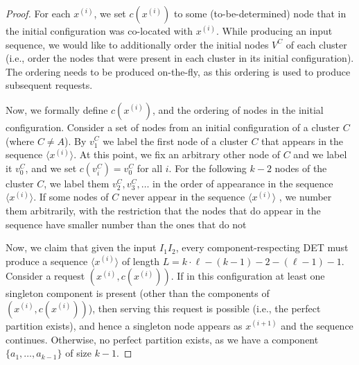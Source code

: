 \begin{proof}
  For each $x^{(i)}$, we set $c(x^{(i)})$ to some (to-be-determined) node that in the initial configuration was co-located with $x^{(i)}$.
  While producing an input sequence, we would like to additionally order the initial nodes $V^C$ of each cluster (i.e., order the nodes that were present in each cluster in its initial configuration).
  The ordering needs to be produced on-the-fly, as this ordering is used to produce subsequent requests.
  
  
  Now, we formally define $c(x^{(i)})$, and the ordering of nodes in the initial configuration.
  Consider a set of nodes from an initial configuration of a cluster $C$ (where $C \neq A$).
  By $v^C_1$ we label the first node of a cluster $C$ that appears in the sequence $\langle x^{(i)}\rangle$.
  At this point, we fix an arbitrary other node of $C$ and we label it $v^C_0$, and we set $c(v^C_i) = v^C_0$ for all $i$.
  For the following $k-2$ nodes of the cluster $C$, we label them $v^C_2, v^C_3, \ldots$ in the order of appearance in the sequence $\langle x^{(i)}\rangle$.
  If some nodes of $C$ never appear in the sequence $\langle x^{(i)}\rangle$ %
  , we number them arbitrarily, with the restriction that the nodes that do appear in the sequence have smaller number than the ones that do not 
  
  Now, we claim that given the input $I_1I_2$, every component-respecting DET 
  must produce a sequence $\langle x^{(i)}\rangle$ of length $L = k\cdot \ell - (k-1) - 2 - (\ell-1) - 1$.
  Consider a request $(x^{(i)}, c(x^{(i)}))$.
  If in this configuration at least one singleton component is present (other than the components of $(x^{(i)}, c(x^{(i)}))$), then serving this request is possible (i.e., the perfect partition exists), and hence a singleton node appears as $x^{(i+1)}$ and the sequence continues.
  Otherwise, no perfect partition exists, as we have a component $\{a_1, \ldots, a_{k-1}\}$ of size $k-1$.


\end{proof}
